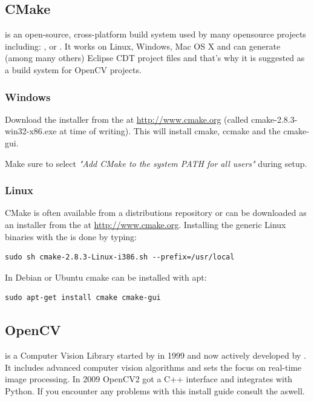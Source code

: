 \subsection{CMake}
 is an open-source, cross-platform build system used by many opensource projects including: ,  or . It works on Linux, Windows, Mac OS X and can generate (among many others) Eclipse CDT project files and that's why it is suggested as a build system for OpenCV projects.

\subsubsection*{Windows} 
Download the installer from the  at \url{http://www.cmake.org} (called cmake-2.8.3-win32-x86.exe at time of writing). This will install cmake, ccmake and the cmake-gui.

Make sure to select \textit{"Add CMake to the system PATH for all users"} during setup.

\subsubsection*{Linux}
CMake is often available from a distributions repository or can be downloaded as an installer from the  at \url{http://www.cmake.org}. Installing the generic Linux binaries with the is done by typing:
\begin{lstlisting}
sudo sh cmake-2.8.3-Linux-i386.sh --prefix=/usr/local 
\end{lstlisting}

In Debian or Ubuntu cmake can be installed with apt:
\begin{lstlisting}
sudo apt-get install cmake cmake-gui
\end{lstlisting}


\subsection{OpenCV}
 is a Computer Vision Library started by  in 1999 and now actively developed by . It includes advanced computer vision algorithms and sets the focus on real-time image processing. In 2009 OpenCV2 got a C++ interface and integrates with Python. If you encounter any problems with this install guide consult the  aswell.
 
